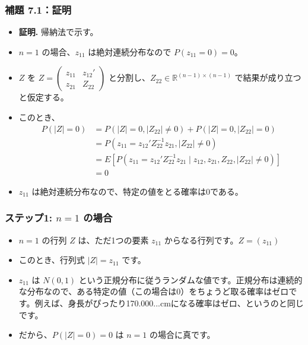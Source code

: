 \documentclass[aspectratio=169]{beamer}
\begin{document}
\begin{frame}
\frametitle{補題 7.1：証明}
\begin{itemize}
    \item \textbf{証明.} 帰納法で示す。
    \item $n=1$ の場合、$z_{11}$ は絶対連続分布なので $P(z_{11}=0)=0$。
    \item $Z$ を $Z=\begin{pmatrix}z_{11}&z_{12}'\\ z_{21}&Z_{22}\end{pmatrix}$ と分割し、$Z_{22}\in\mathbb{R}^{(n-1)\times(n-1)}$ で結果が成り立つと仮定する。
    \item このとき、
    \begin{align*}
        P(|Z|=0) &= P(|Z|=0,|Z_{22}|\ne0) + P(|Z|=0,|Z_{22}|=0) \\
        &= P(z_{11}=z_{12}'Z_{22}^{-1}z_{21},|Z_{22}|\ne0) \\
        &= E[P(z_{11}=z_{12}'Z_{22}^{-1}z_{21} \mid z_{12},z_{21},Z_{22},|Z_{22}|\ne0)] \\
        &= 0
    \end{align*}
    \item $z_{11}$ は絶対連続分布なので、特定の値をとる確率は0である。
\end{itemize}
\end{frame}




\begin{frame}
\frametitle{ステップ1: $n=1$ の場合}
\begin{itemize}
    \item $n=1$ の行列 $Z$ は、ただ1つの要素 $z_{11}$ からなる行列です。$Z=(z_{11})$
    \item このとき、行列式 $|Z|=z_{11}$ です。
    \item $z_{11}$ は $N(0,1)$ という正規分布に従うランダムな値です。正規分布は連続的な分布なので、ある特定の値（この場合は0）をちょうど取る確率はゼロです。例えば、身長がぴったり170.000...cmになる確率はゼロ、というのと同じです。
    \item だから、$P(|Z|=0)=0$ は $n=1$ の場合に真です。
\end{itemize}
\end{frame}
\end{document}
